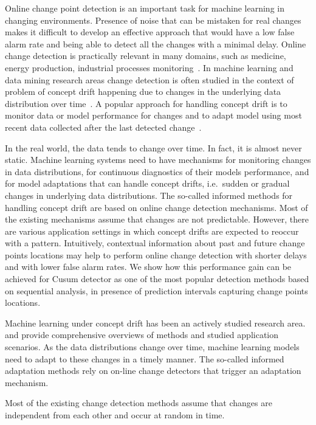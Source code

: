 Online change point detection is an important task for machine learning in changing environments.
Presence of noise that can be mistaken for real changes makes it difficult to develop an effective approach that would have a low false alarm rate and being able to detect all the changes with a minimal delay.
Online change detection is practically relevant in many domains, such as medicine, energy production, industrial processes monitoring~\cite{Nikiforov}.
In machine learning and data mining research areas change detection is often studied in the context of problem of concept drift happening due to changes in the underlying data distribution over time~\cite{Widmer96}. A popular approach for handling concept drift is to monitor data or model performance for changes and to adapt model using most recent data collected after the last detected change~\cite{GamaACMCS2014}.

In the real world, the data tends to change over time.
In fact, it is almost never static.
Machine learning systems need to have mechanisms for monitoring changes in data distributions, for continuous diagnostics of their models performance, and for model adaptations that can handle concept drifts, i.e.\ sudden or gradual changes in underlying data distributions.
The so-called informed methods for handling concept drift are based on online change detection mechanisms. Most of the existing mechanisms assume that changes are not predictable.
However, there are various application settings in which concept drifts are expected to reoccur with a pattern.
Intuitively, contextual information about past and future change points locations may help to perform online change detection with shorter delays and with lower false alarm rates.
We show how this performance gain can be achieved for Cusum detector as one of the most popular detection methods based on sequential analysis, in presence of prediction intervals capturing change points locations.

Machine learning under concept drift has been an actively studied research area. \cite{gama2014survey} and \cite{zliobaite2016overview} provide comprehensive overviews of methods and studied application scenarios. As the data distributions change over time, machine learning models need to adapt to these changes in a timely manner. The so-called informed adaptation methods rely on on-line change detectors that trigger an adaptation mechanism. 

Most of the existing change detection methods assume that changes are independent from each other and occur at random in time.



